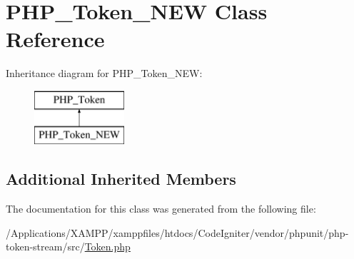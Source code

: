 \hypertarget{class_p_h_p___token___n_e_w}{}\section{P\+H\+P\+\_\+\+Token\+\_\+\+N\+EW Class Reference}
\label{class_p_h_p___token___n_e_w}
Inheritance diagram for P\+H\+P\+\_\+\+Token\+\_\+\+N\+EW\+:\begin{figure}[H]
\begin{center}
\leavevmode
\includegraphics[height=2.000000cm]{class_p_h_p___token___n_e_w}
\end{center}
\end{figure}
\subsection*{Additional Inherited Members}


The documentation for this class was generated from the following file\+:\begin{DoxyCompactItemize}
\item 
/\+Applications/\+X\+A\+M\+P\+P/xamppfiles/htdocs/\+Code\+Igniter/vendor/phpunit/php-\/token-\/stream/src/\mbox{\hyperlink{_token_8php}{Token.\+php}}\end{DoxyCompactItemize}

